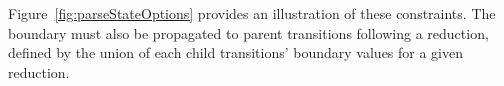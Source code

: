 \documentclass[12pt,a4paper,twoside,openany]{report} \usepackage[pdfborder={0 0 0}]{hyperref}    %
\theoremstyle{definition} \newtheorem{definition}{Definition}[section]
\begin{document}
  Figure~\ref{fig:parseStateOptions} provides an illustration of these constraints. The boundary must also be propagated
  to parent transitions following a reduction, defined by the union of each child transitions' boundary values for
  a given reduction.



\end{document}
